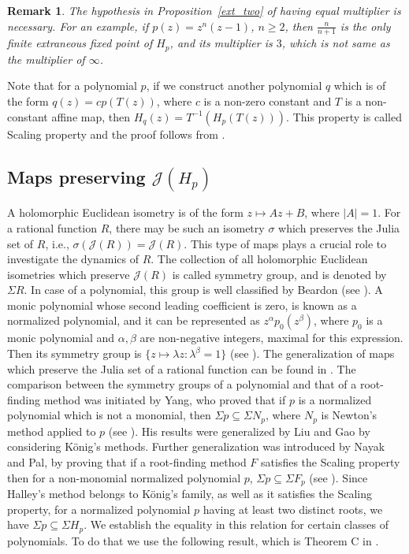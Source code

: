 \documentclass[12pt]{article}
\newtheorem{rem}{Remark}[section]
\begin{document}
\begin{rem}
The hypothesis in Proposition~\ref{ext_two} of having equal multiplier is necessary. For an example, if $p(z)=z^n(z-1)$, $n\geq 2$, then $\frac{n}{n+1}$ is the only finite extraneous fixed point of $H_p$, and its multiplier is $3$, which is not same as the multiplier of $\infty$.
\end{rem}
Note that for a polynomial $p$, if we construct another polynomial $q$ which is of the form $q(z)=c p(T(z))$, where $c$ is a non-zero constant and $T$ is a non-constant affine map, then $H_q(z)=T^{-1}(H_p(T(z)))$. This property is called Scaling property and the proof follows from
\cite[Theorem 2.2]{Nayak-Pal2022}.
\subsection{Maps preserving $\mathcal{J}(H_p)$}\label{Sect_sym}
A holomorphic Euclidean isometry is of the form $z\mapsto Az+B$, where $|A|=1$. For a rational function $R$, there may be such an isometry $\sigma$ which preserves the Julia set of $R$, i.e., $\sigma(\mathcal{J}(R))=\mathcal{J}(R)$. This type of maps plays a crucial role to investigate the dynamics of $R$. The collection of all holomorphic Euclidean isometries which preserve $\mathcal{J}(R)$ is called symmetry group, and is denoted by $\Sigma R$. In case of a polynomial, this group is well classified by Beardon (see \cite[Section 9.5]{Beardon_book}). A monic polynomial whose second leading coefficient is zero, is known as a normalized polynomial, and it can be represented as $z^\alpha p_0(z^\beta)$, where $p_0$ is a monic polynomial and $\alpha, \beta$ are non-negative integers, maximal for this expression. Then its symmetry group is $\{z\mapsto \lambda z: \lambda^\beta=1\}$ (see \cite[Theorem 9.5.4]{Beardon_book}). The generalization of maps which preserve the Julia set of a rational function can be found in \cite{Ferreira2023,NP2025}. The comparison between the symmetry groups of a polynomial and that of a root-finding method was initiated by Yang, who proved that if $p$ is a normalized polynomial which is not a monomial, then $\Sigma p\subseteq \Sigma N_p$, where $N_p$ is Newton's method applied to $p$ (see \cite[Theorem 1.1]{Yang2010}). His results were generalized by Liu and Gao \cite{Liu-Gao2015} by considering K\"{o}nig's methods. Further generalization was introduced by Nayak and Pal, by proving that if a root-finding method $F$ satisfies the Scaling property then for a non-monomial normalized polynomial $p$, $\Sigma p \subseteq \Sigma F_p$ (see \cite[Theorem 1.1]{Sym_dyn}). Since Halley's method belongs to K\"{o}nig's family, as well as it satisfies the Scaling property, for a normalized polynomial $p$ having at least two distinct roots, we have $\Sigma p\subseteq \Sigma H_p.$ We establish the equality in this relation for certain classes of polynomials. To do that we use the following result, which is Theorem C in \cite{NP2025}.
\end{document}
